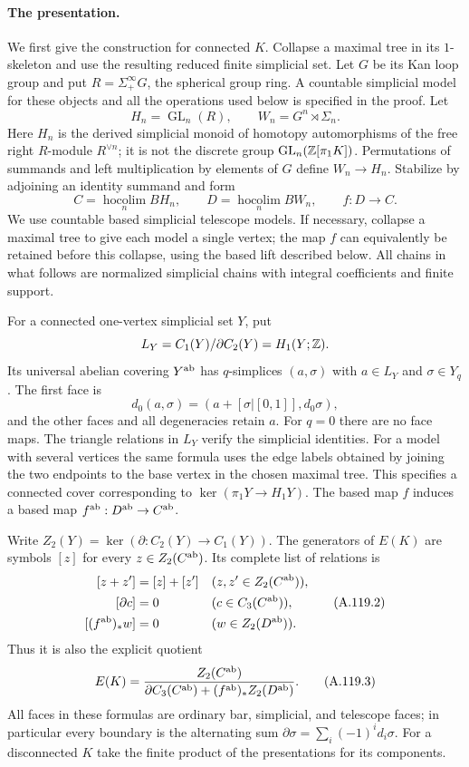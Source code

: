 \paragraph{The presentation.}
We first give the construction for connected $K$. Collapse a maximal
tree in its $1$-skeleton and use the resulting reduced finite simplicial
set. Let $G$ be its Kan loop group and put $R=\Sigma^\infty_+G$, the
spherical group ring. A countable simplicial model for these objects
and all the operations used below is specified in the proof.
Let
\[
 H_n=\operatorname{GL}_n(R),\qquad
 W_n=G^n\rtimes\Sigma_n.
\]
Here $H_n$ is the derived simplicial monoid of homotopy automorphisms
of the free right $R$-module $R^{\vee n}$; it is not the discrete
group $\operatorname{GL}_n(\mathbb Z[\pi_1K])$. Permutations of summands and
left multiplication by elements of $G$ define $W_n\to H_n$.
Stabilize by adjoining an identity summand and form
\[
       C=\operatorname*{hocolim}_n BH_n,\qquad
       D=\operatorname*{hocolim}_n BW_n,
       \qquad f:D\longrightarrow C.                 \tag{A.119.1}
\]
We use countable based simplicial telescope models. If necessary,
collapse a maximal tree to give each model a single vertex; the map
$f$ can equivalently be retained before this collapse, using the
based lift described below. All chains in what follows are normalized
simplicial chains with integral coefficients and finite support.

For a connected one-vertex simplicial set $Y$, put
\[
 L_Y=C_1(Y)/\partial C_2(Y)=H_1(Y;\mathbb Z).
\]
Its universal abelian covering $Y^{\rm ab}$ has $q$-simplices
$(a,\sigma)$ with $a\in L_Y$ and $\sigma\in Y_q$. The first face is
\[
 d_0(a,\sigma)=
 (a+[\sigma|[0,1]],d_0\sigma),
\]
and the other faces and all degeneracies retain $a$. For $q=0$ there
are no face maps. The triangle relations in $L_Y$ verify the
simplicial identities. For a model with several vertices the same
formula uses the edge labels obtained by joining the two endpoints
to the base vertex in the chosen maximal tree. This specifies a
connected cover corresponding to
$\ker(\pi_1Y\to H_1Y)$. The based map $f$ induces a based map
$f^{\rm ab}:D^{\rm ab}\to C^{\rm ab}$.

Write $Z_2(Y)=\ker(\partial:C_2(Y)\to C_1(Y))$. The generators of
$E(K)$ are symbols $[z]$ for every $z\in Z_2(C^{\rm ab})$. Its
complete list of relations is
\[
\begin{aligned}
 [z+z']&=[z]+[z'] &&(z,z'\in Z_2(C^{\rm ab})),\\
 [\partial c]&=0 &&(c\in C_3(C^{\rm ab})),\\
 [(f^{\rm ab})_*w]&=0 &&(w\in Z_2(D^{\rm ab})).
\end{aligned}                                                   \tag{A.119.2}
\]
Thus it is also the explicit quotient
\[
 E(K)=\frac{Z_2(C^{\rm ab})}
 {\partial C_3(C^{\rm ab})+(f^{\rm ab})_*Z_2(D^{\rm ab})}.
                                                               \tag{A.119.3}
\]
All faces in these formulas are ordinary bar, simplicial, and
telescope faces; in particular every boundary is the alternating sum
$\partial\sigma=\sum_i(-1)^id_i\sigma$. For a disconnected $K$
take the finite product of the presentations for its components.

